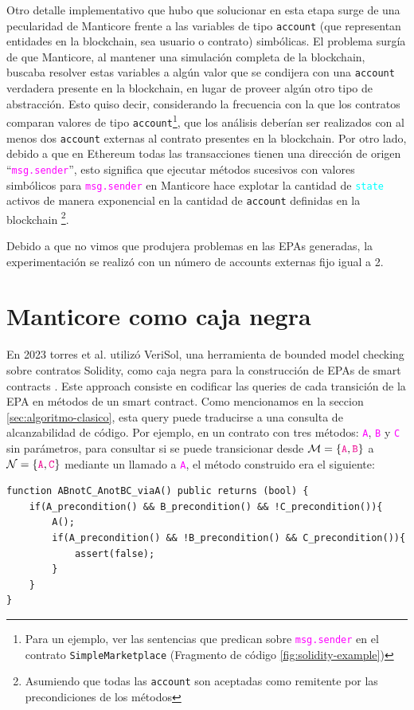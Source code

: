 Otro detalle implementativo que hubo que solucionar en esta etapa surge de una pecularidad de Manticore frente a las variables de tipo \texttt{account} (que representan entidades en la blockchain, sea usuario o contrato) simbólicas.
El problema surgía de que Manticore, al mantener una simulación completa de la blockchain, buscaba resolver estas variables a algún valor que se condijera con una \texttt{account} verdadera presente en la blockchain, en lugar de proveer algún otro tipo de abstracción.
Esto quiso decir, considerando la frecuencia con la que los contratos comparan valores de tipo \texttt{account}\footnote{Para un ejemplo, ver las sentencias que predican sobre \textcolor{magenta}{\texttt{msg.sender}} en el contrato \texttt{SimpleMarketplace} (Fragmento de código \ref{fig:solidity-example})}, que los análisis deberían ser realizados con al menos dos \texttt{account} externas al contrato presentes en la blockchain.
Por otro lado, debido a que en Ethereum todas las transacciones tienen una dirección de origen ``\textcolor{magenta}{\texttt{msg.sender}}'', esto significa que ejecutar métodos sucesivos con valores simbólicos para \textcolor{magenta}{\texttt{msg.sender}} en Manticore hace explotar la cantidad de \textcolor{cyan}{\texttt{state}} activos de manera exponencial en la cantidad de \texttt{account} definidas en la blockchain \footnote{Asumiendo que todas las \texttt{account} son aceptadas como remitente por las precondiciones de los métodos}.

Debido a que no vimos que produjera problemas en las EPAs generadas, la experimentación se realizó con un número de accounts externas fijo igual a 2.

\section{Manticore como caja negra}
En 2023 torres et al. utilizó VeriSol, una herramienta de bounded model checking sobre contratos Solidity, como caja negra para la construcción de EPAs de smart contracts \cite{torres} \cite{verisol}.
Este approach consiste en codificar las queries de cada transición de la EPA en métodos de un smart contract.
Como mencionamos en la seccion \ref{sec:algoritmo-clasico}, esta query puede traducirse a una consulta de alcanzabilidad de código.
Por ejemplo, en un contrato con tres métodos: \textcolor{magenta}{\texttt{A}}, \textcolor{magenta}{\texttt{B}} y \textcolor{magenta}{\texttt{C}} sin parámetros, para consultar si se puede transicionar desde $\mathcal{M}=\{\textcolor{magenta}{\texttt{A}}, \textcolor{magenta}{\texttt{B}}\}$ a $\mathcal{N} = \{\textcolor{magenta}{\texttt{A}}, \textcolor{magenta}{\texttt{C}}\}$ mediante un llamado a \textcolor{magenta}{\texttt{A}}, el método construido era el siguiente:
\begin{lstlisting}[language=Solidity]
function ABnotC_AnotBC_viaA() public returns (bool) {
    if(A_precondition() && B_precondition() && !C_precondition()){
        A();
        if(A_precondition() && !B_precondition() && C_precondition()){
            assert(false);
        }
    }
}
\end{lstlisting}

